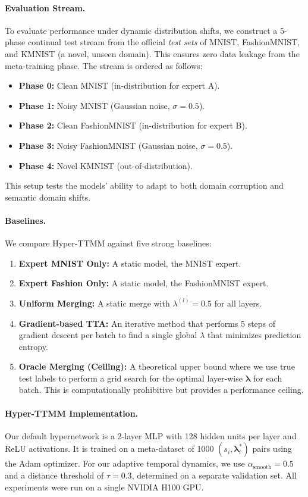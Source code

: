 \documentclass{article}
\theoremstyle{plain}
\theoremstyle{definition}
\theoremstyle{remark}
\begin{document}
\paragraph{Evaluation Stream.} To evaluate performance under dynamic distribution shifts, we construct a 5-phase continual test stream from the official \textit{test sets} of MNIST, FashionMNIST, and KMNIST (a novel, unseen domain). This ensures zero data leakage from the meta-training phase. The stream is ordered as follows:
\begin{itemize}
    \item \textbf{Phase 0:} Clean MNIST (in-distribution for expert A).
    \item \textbf{Phase 1:} Noisy MNIST (Gaussian noise, $\sigma=0.5$).
    \item \textbf{Phase 2:} Clean FashionMNIST (in-distribution for expert B).
    \item \textbf{Phase 3:} Noisy FashionMNIST (Gaussian noise, $\sigma=0.5$).
    \item \textbf{Phase 4:} Novel KMNIST (out-of-distribution).
\end{itemize}
This setup tests the models' ability to adapt to both domain corruption and semantic domain shifts.

\paragraph{Baselines.} We compare Hyper-TTMM against five strong baselines:
\begin{enumerate}
    \item \textbf{Expert MNIST Only:} A static model, the MNIST expert.
    \item \textbf{Expert Fashion Only:} A static model, the FashionMNIST expert.
    \item \textbf{Uniform Merging:} A static merge with $\lambda^{(l)}=0.5$ for all layers.
    \item \textbf{Gradient-based TTA:} An iterative method that performs 5 steps of gradient descent per batch to find a single global $\lambda$ that minimizes prediction entropy.
    \item \textbf{Oracle Merging (Ceiling):} A theoretical upper bound where we use true test labels to perform a grid search for the optimal layer-wise $\boldsymbol{\lambda}$ for each batch. This is computationally prohibitive but provides a performance ceiling.
\end{enumerate}

\paragraph{Hyper-TTMM Implementation.} Our default hypernetwork is a 2-layer MLP with 128 hidden units per layer and ReLU activations. It is trained on a meta-dataset of 1000 $(s_i, \boldsymbol{\lambda}^*_i)$ pairs using the Adam optimizer. For our adaptive temporal dynamics, we use $\alpha_{\text{smooth}}=0.5$ and a distance threshold of $\tau=0.3$, determined on a separate validation set. All experiments were run on a single NVIDIA H100 GPU.
\end{document}
